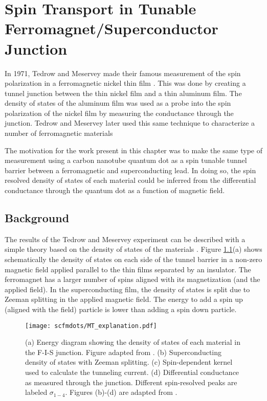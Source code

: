 \chapter{Spin Transport in Tunable Ferromagnet/Superconductor Junction}
\label{sec:SCFM}


In 1971, Tedrow and Meservey made their famous measurement of the spin polarization in a ferromagnetic nickel thin film \cite{Tedrow1971}. This was done by creating a tunnel junction between the thin nickel film and a thin aluminum film. The density of states of the aluminum film was used as a probe into the spin polarization of the nickel film by measuring the conductance through the junction. Tedrow and Meservey later used this same technique to characterize a number of ferromagnetic materials \cite{Tedrow1973}

The motivation for the work present in this chapter was to make the same type of measurement using a carbon nanotube quantum dot as a spin tunable tunnel barrier between a ferromagnetic and superconducting lead. In doing so, the spin resolved density of states of each material could be inferred from the differential conductance through the quantum dot as a function of magnetic field.

\section{Background}

The results of the Tedrow and Meservey experiment can be described with a simple theory based on the density of states of the materials \cite{Meservey1994}. Figure \ref{fig:MT_explanation}(a) shows schematically the density of states on each side of the tunnel barrier in a non-zero magnetic field applied parallel to the thin films separated by an insulator. The ferromagnet has a larger number of spins aligned with its magnetization (and the applied field). In the superconducting film, the density of states is split due to Zeeman splitting in the applied magnetic field. The energy to add a spin up (aligned with the field) particle is lower than adding a spin down particle. 

\begin{figure}
    \centering
    \texttt{[image: scfmdots/MT\_explanation.pdf]}
    \caption{(a) Energy diagram showing the density of states of each material in the F-I-S junction. Figure adapted from \cite{Moodera2010}. (b) Superconducting density of states with Zeeman splitting. (c) Spin-dependent kernel used to calculate the tunneling current. (d) Differential conductance as measured through the junction. Different spin-resolved peaks are labeled $\sigma_{1-4}$. Figures (b)-(d) are adapted from \cite{Meservey1994}.}
    \label{fig:MT_explanation}
\end{figure}

